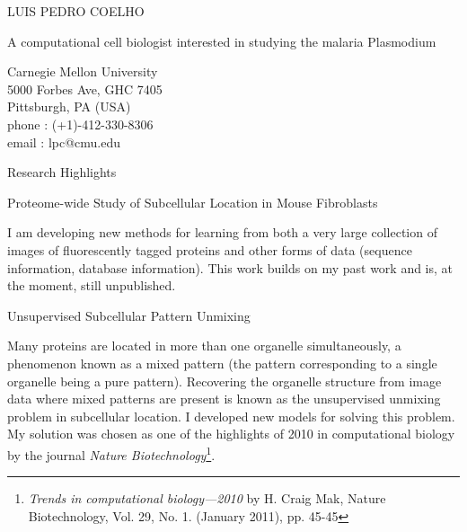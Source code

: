 \documentclass{article}
\renewcommand\section[1]{%
    \par\vspace{2em}%
    {\subhead #1}%
    \par\vspace{1em}%
}
\newcommand\cvitem[2][\relax]{%
    \par\vspace{.8em}
    \if\relax#1\else{\Date \textcolor{medg}{#1}}\hspace{1em}\fi%
    {\CvItem #2}%
    \par\vspace{.4em}
}
\begin{document}
\parindent=0cm

\begin{minipage}[t]{0.60\linewidth}%
\head \textcolor{darkg}{LUIS PEDRO COELHO}

\begin{minipage}[t]{0.70\linewidth}%
\raggedright\Quote\color{darkg} A computational cell biologist interested in studying the malaria Plasmodium
\end{minipage}
\end{minipage}
\hfill
\begin{minipage}[t]{0.26\textwidth}%
\vspace{-2.2em}
{\Contact%
\textcolor{medg}{
Carnegie Mellon University\\
5000 Forbes Ave, GHC 7405\\
Pittsburgh, PA (USA)}\\
\textcolor{darkg}{phone} : (+1)-412-330-8306\\
\textcolor{darkg}{email} : lpc@cmu.edu
}
\end{minipage}

\vspace{2.3em}

\section{Research Highlights}
\Text

\cvitem[2011]{Proteome-wide Study of Subcellular Location in Mouse Fibroblasts}
I am developing new methods for learning from both a very large collection of
images of fluorescently tagged proteins and other forms of data (sequence
information, database information). This work builds on my past work and is, at
the moment, still unpublished.

\cvitem[2010]{Unsupervised Subcellular Pattern Unmixing}
Many proteins are located in more than one organelle simultaneously, a
phenomenon known as a mixed pattern (the pattern corresponding to a single
organelle being a pure pattern). Recovering the organelle structure from image
data where mixed patterns are present is known as the unsupervised unmixing
problem in subcellular location. I developed new models for
solving this problem. My solution was chosen as one of the highlights of 2010
in computational biology by the journal \emph{Nature Biotechnology}\footnote{
\emph{Trends in computational biology—2010} by H. Craig Mak, Nature
Biotechnology, Vol. 29, No. 1. (January 2011), pp. 45-45}.
\end{document}
